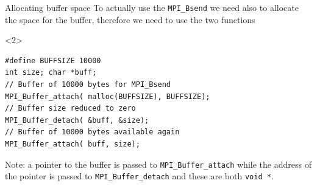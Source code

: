\documentclass[xcolor={svgnames,usenames}]{beamer}
\begin{document}
\begin{frame}[fragile]{Allocating buffer space}
To actually use the \texttt{MPI_Bsend} we need also to allocate the space for the buffer, therefore we need to use the two functions
\begin{onlyenv}<2>
\begin{verbatim}
#define BUFFSIZE 10000
int size; char *buff;
// Buffer of 10000 bytes for MPI_Bsend
MPI_Buffer_attach( malloc(BUFFSIZE), BUFFSIZE);
// Buffer size reduced to zero 
MPI_Buffer_detach( &buff, &size);
// Buffer of 10000 bytes available again 
MPI_Buffer_attach( buff, size); 
\end{verbatim}
\alert{Note:} a pointer to the buffer is passed to \texttt{MPI_Buffer_attach} while the address of the
pointer is passed to \texttt{MPI_Buffer_detach} and these are both \texttt{void *}.
\end{onlyenv}
\end{frame}
\end{document}

